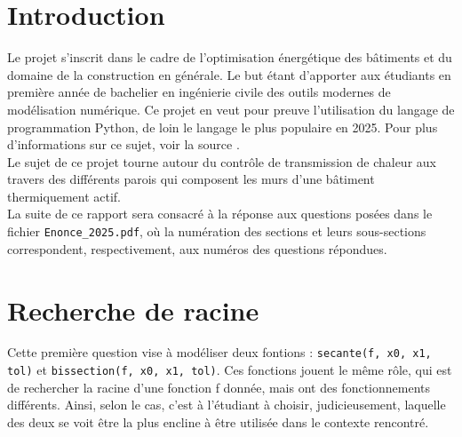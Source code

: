 \documentclass[12pt]{article}
\begin{document}
\sloppy %




\renewcommand{\contentsname}{Table des matières}
\renewcommand{\listfigurename}{Table des figures}
\tableofcontents
\newpage
\listoffigures
\newpage


\renewcommand\thesection{0} %
\section{Introduction}

Le projet s'inscrit dans le cadre de l'optimisation énergétique des bâtiments et du domaine de la construction en générale. Le but étant d'apporter aux étudiants en première année de bachelier en ingénierie civile des outils modernes de modélisation numérique. Ce projet en veut pour preuve l'utilisation du langage de programmation Python, de loin le langage le plus populaire en 2025. Pour plus d'informations sur ce sujet, voir la source \cite{Tiobe2025}. \\
Le sujet de ce projet tourne autour du contrôle de transmission de chaleur aux travers des différents parois qui composent les murs d'une bâtiment thermiquement actif. \\
La suite de ce rapport sera consacré à la réponse aux questions posées dans le fichier \texttt{Enonce\_2025.pdf}, où la numération des sections et leurs sous-sections correspondent, respectivement, aux numéros des questions répondues.

\renewcommand\thesection{\arabic{section}} %
\setcounter{section}{0} %

\section{Recherche de racine}

Cette première question vise à modéliser deux fontions : \texttt{secante(f, x0, x1, tol)} et \texttt{bissection(f, x0, x1, tol)}. Ces fonctions jouent le même rôle, qui est de rechercher la racine d'une fonction f donnée, mais ont des fonctionnements différents. Ainsi, selon le cas, c'est à l'étudiant à choisir, judicieusement, laquelle des deux se voit être la plus encline à être utilisée dans le contexte rencontré.
\end{document}
